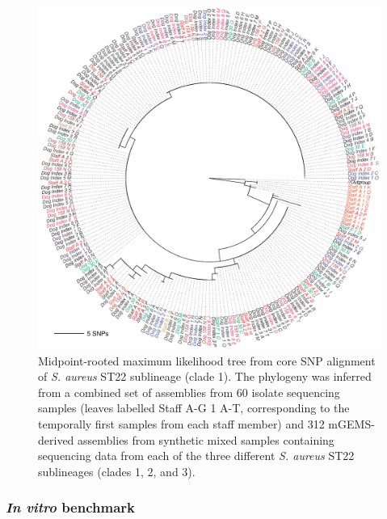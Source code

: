 \documentclass[officiallayout]{tktla}
\begin{document}
\begin{figure}[!t]
  \centering
  \includegraphics[height=0.75\textheight,width=\textwidth,keepaspectratio]{img/reproduced/MGen2021_mGEMS_Figure_6.pdf}
  \caption{Midpoint-rooted maximum likelihood tree from core SNP
    alignment of \textit{S. aureus} ST22 sublineage (clade 1). The
    phylogeny was inferred from a combined set of assemblies from 60
    isolate sequencing samples (leaves labelled Staff A-G 1 A-T,
    corresponding to the temporally first samples from each staff
    member) and 312 mGEMS-derived assemblies from synthetic mixed
    samples containing sequencing data from each of the three
    different \textit{S. aureus} ST22 sublineages (clades 1, 2, and 3).}
    \label{fig:mgems-saureus-phylogeny}
\end{figure}


\subsubsection{\textit{In vitro} benchmark}
\end{document}
